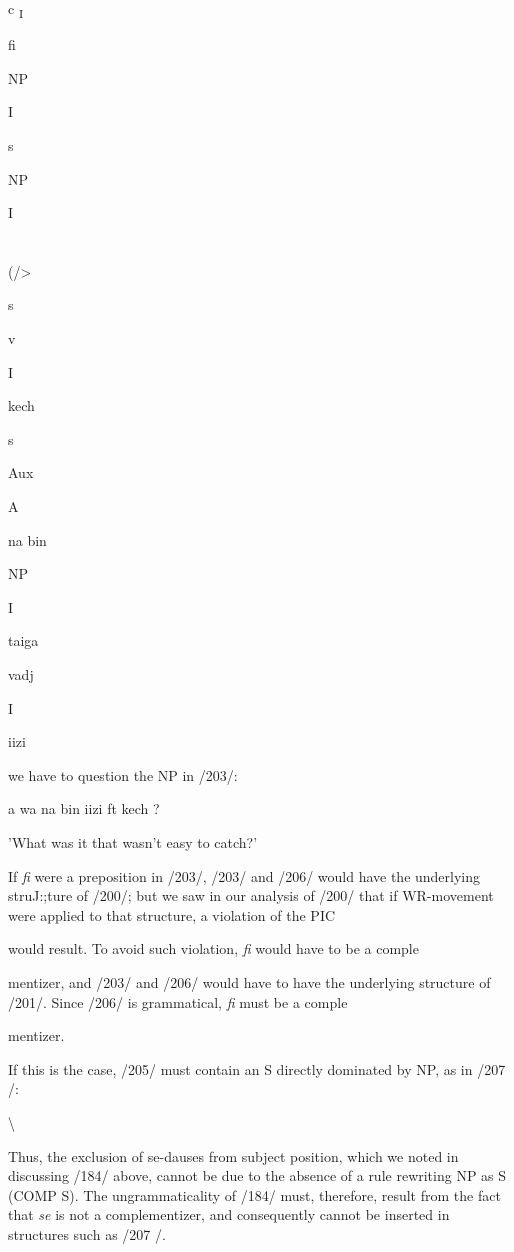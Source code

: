 c \textsubscript{I}

fi

NP

I

s

NP

I

\section{}
(/{\textgreater}

s

v

I

kech

s

Aux

A

na bin

NP

I

taiga

vadj

I

iizi

we have to question the NP in /203/:

\ea\label{ex:206}
 a wa na bin iizi ft kech ?
\glt
\z

'What was it that wasn't easy to catch?'

If \textit{fi} were a preposition in /203/, /203/ and /206/ would have the under\-lying struJ:;ture of /200/; but we saw in our analysis of /200/ that if WR-movement were applied to that structure, a violation of the PIC

would result. To avoid such violation, \textit{fi} would have to be a comple\-

mentizer, and /203/ and /206/ would have to have the underlying structure of /201/. Since /206/ is grammatical, \textit{fi} must be a comple\-

mentizer.

If this is the case, /205/ must contain an S directly dominated by NP, as in /207 /:

{\textbackslash}

Thus, the exclusion of se-dauses from subject position, which we noted in discussing /184/ above, cannot be due to the absence of a rule rewriting NP as S (COMP S). The ungrammaticality of /184/ must, therefore, result from the fact that \textit{se} is not a complementizer, and consequently cannot be inserted in structures such as /207 /.

